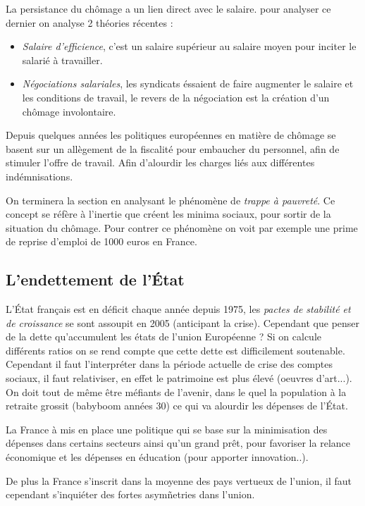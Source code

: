 La persistance du chômage a un lien direct avec le salaire. pour analyser ce dernier on analyse 2 théories récentes : 
\begin{itemize}
	\item \emph{Salaire d'efficience}, c'est un salaire supérieur au salaire moyen pour inciter le salarié à travailler.
	\item \emph{Négociations salariales}, les syndicats éssaient de faire augmenter le salaire et les conditions de travail, le revers de la négociation 
	est la création d'un chômage involontaire.
\end{itemize}
Depuis quelques années les politiques européennes en matière de chômage se basent sur un allègement de la fiscalité pour embaucher du personnel, afin 
de stimuler l'offre de travail. Afin d'alourdir les charges liés aux différentes indémnisations. 

On terminera la section en analysant le phénomène de \emph{trappe à pauvreté}. Ce concept se réfère à l'inertie que créent les minima sociaux, pour sortir de
la situation du chômage. Pour contrer ce phénomène on voit par exemple une prime de reprise d'emploi de 1000 euros en France.

\subsection{L'endettement de l'État} %
\label{sub:l_endettement_de_l_etat}

L'État français est en déficit chaque année depuis 1975, les \emph{ pactes de stabilité et de croissance} se sont assoupit en 2005 (anticipant la crise).
Cependant que penser de la dette qu'accumulent les états de l'union Européenne ? Si on calcule différents ratios on se rend compte que cette dette est 
difficilement soutenable. Cependant il faut l'interpréter dans la période actuelle de crise des comptes sociaux, il faut relativiser, en effet le patrimoine
est plus élevé (oeuvres d'art...). On doit tout de même être méfiants de l'avenir, dans le quel la population à la retraite grossit (babyboom années 30)
ce qui va alourdir les dépenses de l'État.

La France à mis en place une politique qui se base sur la minimisation des dépenses dans certains secteurs ainsi qu'un grand prêt, pour favoriser la relance 
économique et les dépenses en éducation (pour apporter innovation..). 

De plus la France s'inscrit dans la moyenne des pays vertueux de l'union, il faut cependant s'inquiéter des fortes asymñetries dans l'union.



